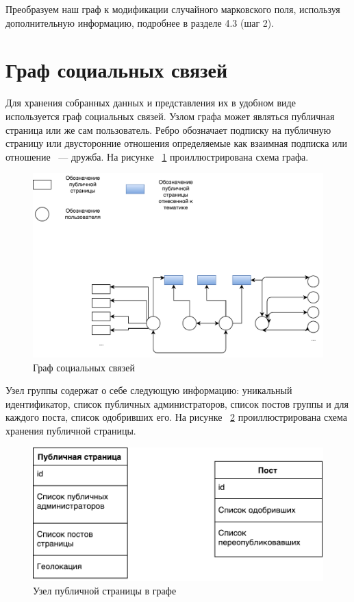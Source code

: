 \documentclass[annotation,times,page4]{itmo-student-thesis}
\begin{document}
Преобразуем наш граф к модификации случайного марковского поля, используя дополнительную информацию, подробнее в разделе 4.3 (шаг 2).

\section{Граф социальных связей}
Для хранения собранных данных и представления их в удобном виде используется граф социальных связей.
Узлом графа может являться публичная страница или же сам пользователь. Ребро обозначает подписку на публичную страницу или двусторонние отношения определяемые как взаимная подписка или отношение ~--- дружба. На рисунке ~\ref{fig:grapth} проиллюстрирована схема графа.

\begin{figure}[!h]
\caption{Граф социальных связей}
\label{fig:grapth}
\centering
\includegraphics[width=\textwidth]{figs/graph.pdf}
\end{figure}

Узел группы содержат о себе следующую информацию: уникальный идентификатор, список публичных администраторов, список постов группы и для каждого поста, список одобривших его. На рисунке ~\ref{fig:public} проиллюстрирована схема хранения публичной страницы.

\begin{figure}[!h]
\caption{Узел публичной страницы в графе}
\label{fig:public}
\centering
\includegraphics[width=\textwidth]{figs/public.pdf}
\end{figure}
\end{document}
